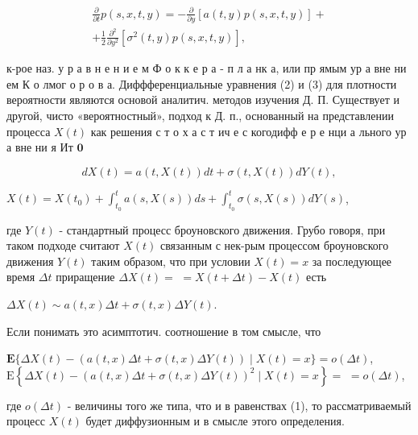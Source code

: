 \documentclass[10pt]{article}
\begin{document}
\[

\begin{gathered}

\frac{\partial}{\partial t} p(s, x, t, y)=-\frac{\partial}{\partial y}[a(t, y) p(s, x, t, y)]+ \\

+\frac{1}{2} \frac{\partial^{2}}{\partial y^{2}}\left[\sigma^{2}(t, y) p(s, x, t, y)\right],

\end{gathered}

\]



к-рое наз. у р а в н е н и е м Ф о к к е р а - п л а нк а, или пр ямым ур а вне ни ем К о лмог о р о в а. Диффференциальные уравнения (2) и (3) для плотности вероятности являются основой аналитич. методов изучения Д. П. Существует и другой, чисто «вероятностный», подход к Д. п., основанный на представлении процесса $X(t)$ как решения с т о х а с т ич е с когодифф е р е нци а льного ур а вне ни я Ит $\mathbf{0}$



\[

d X(t)=a(t, X(t)) d t+\sigma(t, X(t)) d Y(t),

\]



$X(t)=X\left(t_{0}\right)+\int_{t_{0}}^{t} a(s, X(s)) d s+\int_{t_{0}}^{t} \sigma(s, X(s)) d Y(s)$,



где $Y(t)$ - стандартный процесс броуновского движения. Грубо говоря, при таком подходе считают $X(t)$ связанным с нек-рым процессом броуновского движения $Y(t)$ таким образом, что при условии $X(t)=x$ за последующее время $\Delta t$ приращение $\Delta X(t)=$ $=X(t+\Delta t)-X(t)$ есть



$\Delta X(t) \sim a(t, x) \Delta t+\sigma(t, x) \Delta Y(t)$.



Если понимать это асимптотич. соотношение в том смысле, что



$\mathbf{E}\{\Delta X(t)-(a(t, x) \Delta t+\sigma(t, x) \Delta Y(t)) \mid X(t)=x\}=o(\Delta t)$, $\mathrm{E}\left\{\Delta X(t)-(a(t, x) \Delta t+\sigma(t, x) \Delta Y(t))^{2} \mid X(t)=x\right\}=$ $=o(\Delta t)$,



где $o(\Delta t)$ - величины того же типа, что и в равенствах (1), то рассматриваемый процесс $X(t)$ будет диффузионным и в смысле этого определения.
\end{document}
